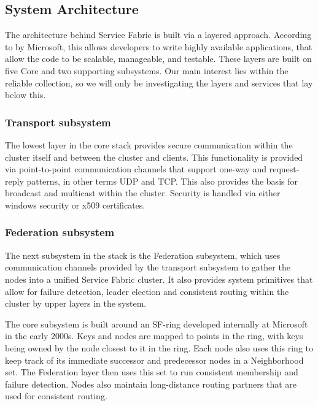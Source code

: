 \documentclass[a4paper,10pt,titlepage]{report}
\begin{document}
    \subsection{System Architecture}

    The architecture behind Service Fabric is built via a layered approach. According to by Microsoft, this allows developers to write highly available applications, that allow the code to be scalable, manageable, and testable. These layers are built on five Core and two supporting subsystems. Our main interest lies within the reliable collection, so we will only be investigating the layers and services that lay below this.\\
    \vspace{5mm}

    \subsubsection{Transport subsystem}
    The lowest layer in the core stack provides secure communication within the cluster itself and between the cluster and clients. This functionality is provided via point-to-point communication channels that support one-way and request-reply patterns, in other terms UDP and TCP. This also provides the basis for broadcast and multicast within the cluster. Security is handled via either windows security or x509 certificates. \\
    \vspace{5mm}

    \subsubsection{Federation subsystem}

    The next subsystem in the stack is the Federation subsystem, which uses communication channels provided by the transport subsystem to gather the nodes into a unified Service Fabric cluster. It also provides system primitives that allow for failure detection, leader election and consistent routing within the cluster by upper layers in the system.\\
    \vspace{5mm}

    The core subsystem is built around an SF-ring developed internally at Microsoft in the early 2000s. Keys and nodes are mapped to points in the ring, with keys being owned by the node closest to it in the ring. Each node also uses this ring to keep track of its immediate successor and predecessor nodes in a Neighborhood set. The Federation layer then uses this set to run consistent membership and failure detection. Nodes also maintain long-distance routing partners that are used for consistent routing.\\
    \vspace{5mm}
\end{document}
